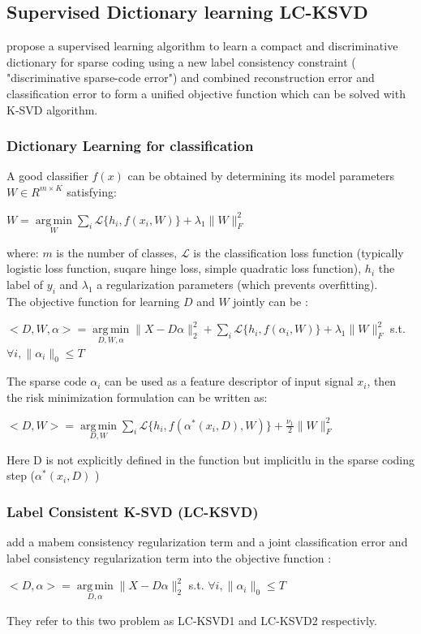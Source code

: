 \documentclass[a4paper,10pt]{article}
\DeclareMathOperator*{\argmin}{arg\,min}
\begin{document}
\subsection{Supervised Dictionary learning LC-KSVD}
\cite{6516503} propose a supervised learning algorithm to learn a compact and discriminative dictionary for sparse coding using a new label consistency constraint ( "discriminative sparse-code error") and combined reconstruction error and classification error to form a unified objective function which can be solved with K-SVD algorithm.
\subsubsection{Dictionary Learning for classification}
A good classifier $f(x)$ can be obtained by determining its model parameters $W \in R^{m \times K} $ satisfying:
\begin{center}
 $W = \underset{W}{\argmin} \underset{i}{\sum}\mathcal{L}\{h_i,f(x_i,W)\} + \lambda_1 \|W\|^2_F$
\end{center}
where: $m$ is the number of classes, $\mathcal{L}$ is the classification loss function (typically logistic loss function, suqare hinge loss, simple quadratic loss function), $h_i$ the label of $y_i$ and $\lambda_1$ a regularization parameters (which prevents overfitting).\\
The objective function for learning $D$ and $W$ jointly can be :
\begin{center}
 $<D,W,\alpha> = \underset{D,W,\alpha}{\argmin} \|X -D\alpha\|^2_2 + \underset{i}{\sum}\mathcal{L}\{h_i,f(\alpha_i,W)\} + \lambda_1 \|W\|^2_F$  s.t.  $\forall i, \|\alpha_i\|_0 \leq T$ 
\end{center}

The sparse code $\alpha_i$ can be used as a feature descriptor of input signal $x_i$, then the risk minimization formulation can be written as:
\begin{center}
 $<D,W> = \underset{D,W}{\argmin}\underset{i}{\sum}\mathcal{L}\{h_i,f(\alpha^*(x_i,D),W)\} + \frac{\nu_1}{2}\|W\|^2_F$
\end{center}
Here D is not explicitly defined in the function but implicitlu in the sparse coding step ($\alpha^*(x_i,D)$ )

\subsubsection{Label Consistent K-SVD (LC-KSVD)}
\cite{6516503} add a mabem consistency regularization term and a joint classification error and label consistency regularization term into the objective function :
\begin{center}
 $<D,\alpha> = \underset{D,\alpha}{\argmin} \|X - D\alpha\|^2_2$ s.t. $ \forall i, \|\alpha_i\|_0 \leq T$
\end{center}
They refer to this two problem as LC-KSVD1 and LC-KSVD2 respectivly.
\end{document}
